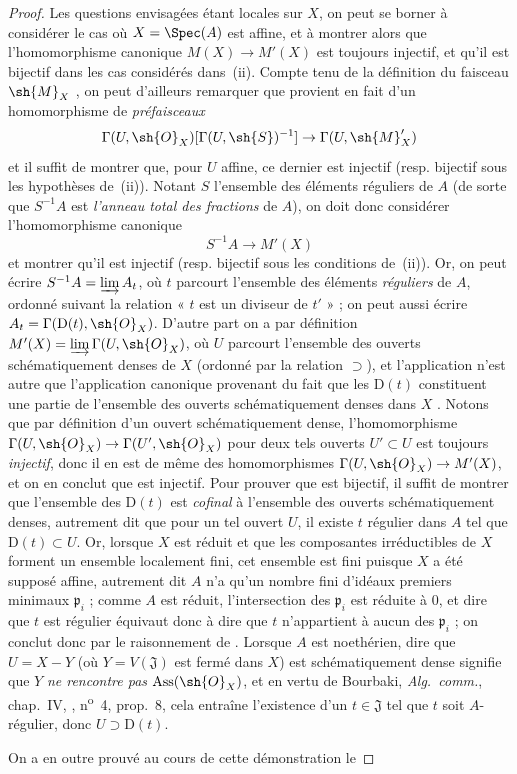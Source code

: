 \begin{proof}
Les questions envisagées étant locales sur $X$, on peut se borner à considérer le cas où $X=\Spec(A)$ est affine, et à montrer alors que l'homomorphisme canonique $M(X)\to M'(X)$ est toujours injectif, et qu'il est bijectif dans les cas considérés dans~(ii).
Compte tenu de la définition du faisceau $\sh{M}_X$ , on peut d'ailleurs remarquer que  provient en fait d'un homomorphisme de \emph{préfaisceaux}
\[
  \Gamma(U,\sh{O}_X)[\Gamma(U,\sh{S})^{-1}]\to\Gamma(U,\sh{M}'_X)
\]
et il suffit de montrer que, pour $U$ affine, ce dernier est injectif (resp. bijectif sous les hypothèses de~(ii)).
Notant $S$ l'ensemble des éléments réguliers de $A$ (de sorte que $S^{-1}A$ est \emph{l'anneau total des fractions} de $A$), on doit donc considérer l'homomorphisme canonique
\[
\label{IV.20.2.11.1}
  S^{-1}A\to M'(X)
  \tag{20.2.11.1}
\]
et montrer qu'il est injectif (resp. bijectif sous les conditions de~(ii)).
Or, on peut écrire $S^{-1}A=\varinjlim A_t$, où $t$ parcourt l'ensemble des éléments \emph{réguliers} de $A$, ordonné suivant la relation « $t$ est un diviseur de $t'$ »  ; on peut aussi écrire $A_t=\Gamma(\mathrm{D}(t),\sh{O}_X)$.
D'autre part on a par définition $M'(X)=\varinjlim\Gamma(U,\sh{O}_X)$, où $U$ parcourt l'ensemble des ouverts schématiquement denses de $X$ (ordonné par la relation $\supset$), et l'application  n'est autre que l'application canonique provenant du fait que les $\mathrm{D}(t)$ constituent une partie de l'ensemble des ouverts schématiquement denses dans $X$ .
Notons que par définition d'un ouvert schématiquement dense, l'homomorphisme $\Gamma(U,\sh{O}_X)\to\Gamma(U',\sh{O}_X)$ pour deux tels ouverts $U'\subset U$ est toujours \emph{injectif}, donc il en est de même des homomorphismes $\Gamma(U,\sh{O}_X)\to M'(X)$, et on en conclut que  est injectif.
Pour prouver que  est bijectif, il suffit de montrer que l'ensemble des $\mathrm{D}(t)$ est \emph{cofinal} à l'ensemble des ouverts schématiquement denses, autrement dit que pour un tel ouvert $U$, il existe $t$ régulier dans $A$ tel que $\mathrm{D}(t)\subset U$.
Or, lorsque $X$ est réduit et que les composantes irréductibles de $X$ forment un ensemble localement fini, cet ensemble est fini puisque $X$ a été supposé affine, autrement dit $A$ n'a qu'un nombre fini d'idéaux premiers minimaux $\mathfrak{p}_i$ ; comme $A$ est réduit, l'intersection des $\mathfrak{p}_i$ est réduite à $0$, et dire que $t$ est régulier équivaut donc à dire que $t$ n'appartient à aucun des $\mathfrak{p}_i$ ; on conclut donc par le raisonnement de .
Lorsque $A$ est noethérien, dire que $U=X-Y$ (où $Y=V(\mathfrak{J})$ est fermé dans $X$) est schématiquement dense signifie  que $Y$ \emph{ne rencontre pas} $\operatorname{Ass}(\sh{O}_X)$, et en vertu de Bourbaki, \emph{Alg.~comm.}, chap.~IV, , n\textsuperscript{o}~4, prop.~8, cela entraîne l'existence d'un $t\in\mathfrak{J}$ tel que $t$ soit $A$-régulier, donc $U\supset\mathrm{D}(t)$.

On a en outre prouvé au cours de cette démonstration le
\end{proof}

